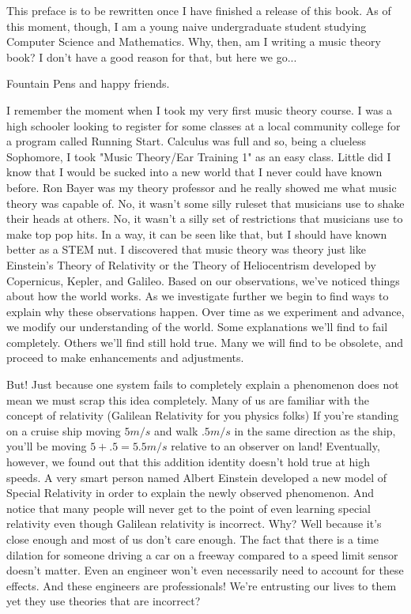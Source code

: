\documentclass[../OpenAppliedMusicTheory.tex]{subfiles}
\begin{document}
    


    This preface is to be rewritten once I have finished a release of this book. As of this moment, though, I am a young naive undergraduate student studying Computer Science and Mathematics. Why, then, am I writing a music theory book? I don't have a good reason for that, but here we go...

    Fountain Pens and happy friends. 

    I remember the moment when I took my very first music theory course. I was a high schooler looking to register for some classes at a local community college for a program called Running Start. Calculus was full and so, being a clueless Sophomore, I took "Music Theory/Ear Training 1" as an easy class. Little did I know that I would be sucked into a new world that I never could have known before. Ron Bayer was my theory professor and he really showed me what music theory was capable of. No, it wasn't some silly ruleset that musicians use to shake their heads at others. No, it wasn't a silly set of restrictions that musicians use to make top pop hits. In a way, it can be seen like that, but I should have known better as a STEM nut. I discovered that music theory was theory just like Einstein's Theory of Relativity or the Theory of Heliocentrism developed by Copernicus, Kepler, and Galileo. Based on our observations, we've noticed things about how the world works. As we investigate further we begin to find ways to explain why these observations happen. Over time as we experiment and advance, we modify our understanding of the world. Some explanations we'll find to fail completely. Others we'll find still hold true. Many we will find to be obsolete, and proceed to make enhancements and adjustments. 

    But! Just because one system fails to completely explain a phenomenon does not mean we must scrap this idea completely. Many of us are familiar with the concept of relativity (Galilean Relativity for you physics folks) If you're standing on a cruise ship moving $5m/s$ and walk $.5m/s$ in the same direction as the ship, you'll be moving $5+.5=5.5m/s$ relative to an observer on land! Eventually, however, we found out that this addition identity doesn't hold true at high speeds. A very smart person named Albert Einstein developed a new model of Special Relativity in order to explain the newly observed phenomenon. And notice that many people will never get to the point of even learning special relativity even though Galilean relativity is incorrect. Why? Well because it's close enough and most of us don't care enough. The fact that there is a time dilation for someone driving a car on a freeway compared to a speed limit sensor doesn't matter. Even an engineer won't even necessarily need to account for these effects. And these engineers are professionals! We're entrusting our lives to them yet they use theories that are incorrect?
\end{document}
